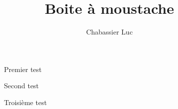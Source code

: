 \documentclass{article}
\title{Boite à moustache}
\author{Chabassier Luc}
\begin{document}
\maketitle

\begin{figure}[h]
	\begin{center}
	\end{center}
	\caption{Premier test}
\end{figure}

\begin{figure}[h]
	\begin{center}
	\end{center}
	\caption{Second test}
\end{figure}

\begin{figure}[h]
	\begin{center}
	\end{center}
	\caption{Troisième test}
\end{figure}
\end{document}
